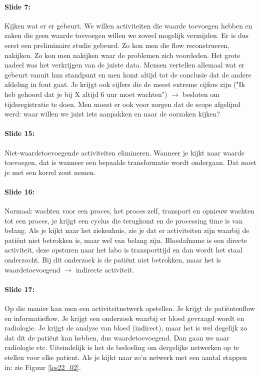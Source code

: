 \documentclass[10pt,a4paper]{report}
\begin{document}
\paragraph{Slide 7:} Kijken wat er er gebeurt. We willen activiteiten die waarde toevoegen hebben en zaken die geen waarde toevoegen willen we zoveel mogelijk vermijden. Er is dus eerst een preliminaire studie gebeurd. Zo kon men die flow reconstrueren, nakijken. Zo kon men nakijken waar de problemen zich voordeden. Het grote nadeel was het verkrijgen van de juiste data. Mensen vertellen allemaal wat er gebeurt vanuit hun standpunt en men komt altijd tot de conclusie dat de andere afdeling in fout gaat. Je krijgt ook cijfers die de meest extreme cijfers zijn ("Ik heb gehoord dat je bij X altijd 6 uur moet wachten") $\rightarrow$ besloten om tijdsregistratie te doen. Men moest er ook voor zorgen dat de scope afgelijnd werd: waar willen we juist iets aanpakken en naar de oorzaken kijken?

\paragraph{Slide 15:} Niet-waardetoevoegende activiteiten elimineren. Wanneer je kijkt naar waarde toevoegen, dat is wanneer een bepaalde transformatie wordt ondergaan. Dat moet je met een korrel zout nemen. 

\paragraph{Slide 16:} Normaal: wachten voor een proces, het proces zelf, transport en opnieuw wachten tot een proces, je krijgt een cyclus die terugkomt en de processing time is van belang. Als je kijkt naar het ziekenhuis, zie je dat er activiteiten zijn waarbij de pati\"ent niet betrokken is, maar wel van belang zijn. Bloedafname is een directe activiteit, deze opsturen naar het labo is transporttijd en dan wordt het staal onderzocht. Bij dit onderzoek is de pati\"ent niet betrokken, maar het is waardetoevoegend $\rightarrow$ indirecte activiteit.

\paragraph{Slide 17:} Op die manier kan men een activiteitnetwerk opstellen. Je krijgt de pati\"entenflow en informatieflow. Je krijgt een onderzoek waarbij er bloed gevraagd wordt en radiologie. Je krijgt de analyse van bloed (indirect), maar het is wel degelijk zo dat dit de pati\"ent kan hebben, dus waardetoevoegend. Dan gaan we naar radiologie etc.
Uiteindelijk is het de bedoeling om dergelijke netwerken op te stellen voor elke patient. Als je kijkt naar zo'n netwerk met een aantal stappen in: zie Figuur \ref{les22_02}.
\end{document}

